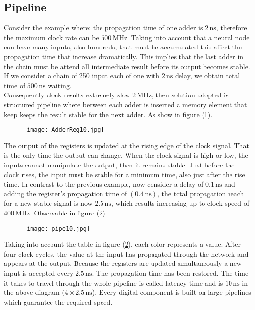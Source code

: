 \subsection{Pipeline}
\label{ssec:hard-pipeline}
Consider the example where: the propagation time of one adder is $2 \,
\si{\nano\second}$, therefore the maximum clock rate can be $500
\,\si{\mega\hertz}$. Taking into account that a neural node can have many
inputs, also hundreds, that must be accumulated this affect the propagation time
that increase dramatically. This implies that the last adder in the chain must
be attend all intermediate result before its output becomes stable. 
If we consider a chain of 250 input each of one with $2\, \si{\nano\second}$
delay, we obtain total time of $500 \,\si{\nano\second}$ waiting. \\ 
Consequently clock results extremely slow $2\,\si{\mega\hertz}$, then solution
adopted is structured pipeline where between each adder is inserted a memory
element that keep keeps the result stable for the next adder. 
As show in figure (\ref{fig:4-bit-adder-register}). \hfill \break
%
\begin{figure}[!h]
	\centering
	\texttt{[image: AdderReg10.jpg]}
	\label{fig:4-bit-adder-register}
\end{figure}
%
\break The output of the registers is updated at the rising edge of the clock
signal. That is the only time the output can change. When the clock signal is
high or low, the inputs cannot manipulate the output, then it remains stable. 
Just before the clock rises, the input must be stable for a minimum time, also
just after the rise time. In contrast to the previous example, now consider a
delay of $0.1 \,\si{\nano\second}$ and adding the register's propagation time of
$(0.4 \,\si{\nano\second})$, the total propagation reach for a new stable signal
is now $2.5 \,\si{\nano\second}$, which results increasing up to clock speed of
$400 \,\si{\mega\hertz}$. Observable in figure (\ref{fig:pipe}). \hfill \break
%
\begin{figure}[htb]
	\centering
	\texttt{[image: pipe10.jpg]}
	\label{fig:pipe}
\end{figure}
%
%
\newline
Taking into account the table in figure (\ref{fig:pipe}), each color represents a
value. After four clock cycles, the value at the input has propagated through
the network and appears at the output.	Because the registers are updated
simultaneously a new input is accepted every $2.5 \,\si{\nano\second}$.	The
propagation time has been restored. The time it takes to travel through the
whole pipeline is called latency time and is $10 \,\si{\nano\second}$ in the
above diagram $(4 \times 2.5 \,\si{\nano\second}$). Every digital component is
built on large pipelines which guarantee the required speed.\cite{TPU:explained}
 
